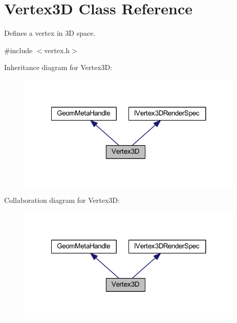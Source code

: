 \hypertarget{class_vertex3_d}{\section{Vertex3\-D Class Reference}
\label{class_vertex3_d}
}


Defines a vertex in 3\-D space.  




{\ttfamily \#include $<$vertex.\-h$>$}



Inheritance diagram for Vertex3\-D\-:\nopagebreak
\begin{figure}[H]
\begin{center}
\leavevmode
\includegraphics[width=305pt]{class_vertex3_d__inherit__graph}
\end{center}
\end{figure}


Collaboration diagram for Vertex3\-D\-:\nopagebreak
\begin{figure}[H]
\begin{center}
\leavevmode
\includegraphics[width=305pt]{class_vertex3_d__coll__graph}
\end{center}
\end{figure}
